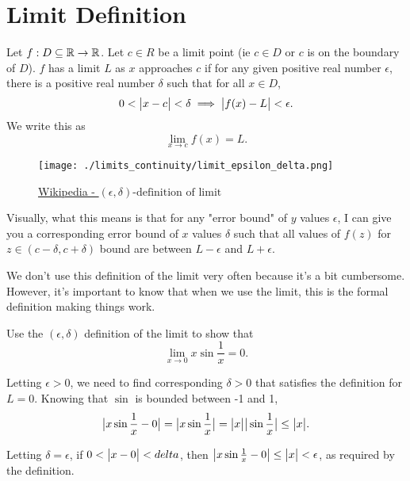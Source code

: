 \section{Limit Definition}
\begin{definition}
	Let $f : D \subseteq \mathbb{R} \to \mathbb{R}$.
	Let $c \in R$ be a limit point (ie $c \in D$ or $c$ is on the boundary of $D$).
	$f$ has a limit $L$ as $x$ approaches $c$ if for any given positive real number $\epsilon$, there is a positive real number $\delta$ such that for all $x \in D$,
	\begin{equation}
		0 < \big\lvert x-c \big\rvert < \delta \implies \big\lvert f(x) - L \big\rvert < \epsilon.
	\end{equation}
	We write this as
	\begin{equation*}
		\lim_{x \to c}{f(x)} = L.	
	\end{equation*}
\end{definition}

\begin{figure}[H]
	\label{epsilon_delta}
	\centering
	\texttt{[image: ./limits\_continuity/limit\_epsilon\_delta.png]}
	\caption{\hyperref{https://en.wikipedia.org/wiki/(\%CE\%B5,\_\%CE\%B4)-definition\_of\_limit}{}{}{Wikipedia - $(\epsilon, \delta)\text{-definition of limit}$}}
\end{figure}

Visually, what this means is that for any "error bound" of $y$ values $\epsilon$, I can give you a corresponding error bound of $x$ values $\delta$ such that all values of $f(z)$ for $z \in (c -\delta, c+ \delta)$ bound are between $L - \epsilon$ and $L + \epsilon$.


We don't use this definition of the limit very often because it's a bit cumbersome.
However, it's important to know that when we use the limit, this is the formal definition making things work.

\begin{example}
	Use the $(\epsilon, \delta)$ definition of the limit to show that
	\begin{equation*}
		\lim_{x\to 0}{x\sin{\frac{1}{x}}} = 0.
	\end{equation*}
\end{example}
\begin{answer}
	Letting $\epsilon > 0$, we need to find corresponding $\delta > 0$ that satisfies the definition for $L = 0$.
	Knowing that $\sin$ is bounded between -1 and 1,
	\begin{equation*}
		\big\lvert x\sin{\frac{1}{x}} - 0 \big\rvert = \big\lvert x\sin{\frac{1}{x}} \big\rvert = \big\lvert x \big\rvert\big\lvert \sin{\frac{1}{x}} \big\rvert \leq \big\lvert x \big\rvert.
	\end{equation*}
	
	Letting $\delta = \epsilon$, if $0 < \big\lvert x - 0 \big\rvert < delta$, then $\big\lvert x\sin{\frac{1}{x}} - 0 \big\rvert \leq \big\lvert x \big\rvert < \epsilon$, as required by the definition.
\end{answer}